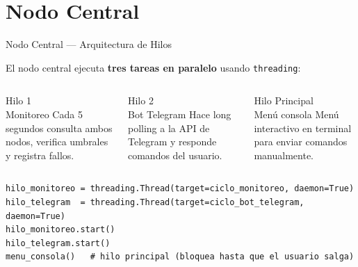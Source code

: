 \documentclass[aspectratio=169]{beamer}
\begin{document}
\section{Nodo Central}

\begin{frame}[fragile]{Nodo Central --- Arquitectura de Hilos}

El nodo central ejecuta \textbf{tres tareas en paralelo} usando \texttt{threading}:

\vspace{0.5em}
\begin{columns}
\begin{block}{Hilo 1\\\small Monitoreo}
Cada 5 segundos consulta ambos nodos, verifica umbrales y registra fallos.
\end{block}

\begin{block}{Hilo 2\\\small Bot Telegram}
Hace long polling a la API de Telegram y responde comandos del usuario.
\end{block}

\begin{block}{Hilo Principal\\\small Men\'u consola}
Men\'u interactivo en terminal para enviar comandos manualmente.
\end{block}
\end{columns}

\vspace{1em}
\begin{lstlisting}
hilo_monitoreo = threading.Thread(target=ciclo_monitoreo, daemon=True)
hilo_telegram  = threading.Thread(target=ciclo_bot_telegram, daemon=True)
hilo_monitoreo.start()
hilo_telegram.start()
menu_consola()   # hilo principal (bloquea hasta que el usuario salga)
\end{lstlisting}
\end{frame}
\end{document}
